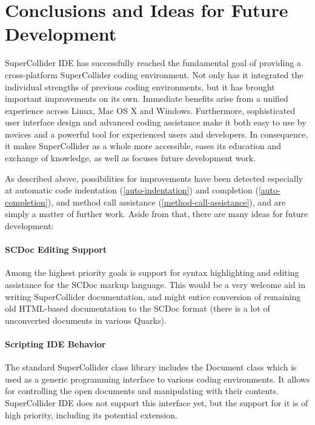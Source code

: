 \documentclass[11pt,a4paper]{article}
\begin{document}
\section{Conclusions and Ideas for Future Development}

SuperCollider IDE has successfully reached the fundamental goal of providing a cross-platform SuperCollider coding
environment. Not only has it integrated the individual strengths of previous coding environments, but it has brought
important improvements on its own. Immediate benefits arise from a unified experience across Linux, Mac OS X and
Windows. Furthermore, sophisticated user interface design and advanced coding assistance make it both easy
to use by novices and a powerful tool for experienced users and developers. In consequence, it makes SuperCollider
as a whole more accessible, eases its education and exchange of knowledge, as well as focuses future development work.

As described above, possibilities for improvements have been detected especially at automatic code indentation
(\ref{auto-indentation}) and completion (\ref{auto-completion}), and method call assistance
(\ref{method-call-assistance}), and are simply a matter of further work. Aside from that, there are many ideas for
future development:

\paragraph{SCDoc Editing Support} \hfill

Among the highest priority goals is support for syntax highlighting and editing assistance for the SCDoc markup
language. This would be a very welcome aid in writing SuperCollider documentation, and might entice conversion of
remaining old HTML-based documentation to the SCDoc format (there is a lot of unconverted documents in various Quarks).

\paragraph{Scripting IDE Behavior} \hfill

The standard SuperCollider class library includes the Document class which is used as a generic programming interface to
various coding environments. It allows for controlling the open documents and manipulating with their contents.
SuperCollider IDE does not support this interface yet, but the support for it is of high priority, including its
potential extension.
\end{document}
